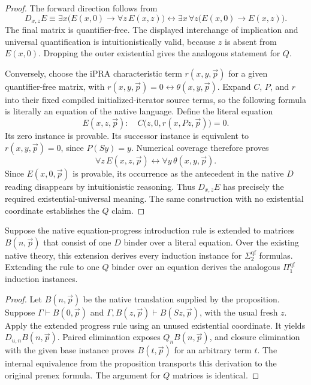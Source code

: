 \begin{proof}
The forward direction follows from
\[
 D_{x,z}E\equiv
 \exists x\bigl(E(x,0)\to\forall z\,E(x,z)\bigr)
 \leftrightarrow
 \exists x\,\forall z\bigl(E(x,0)\to E(x,z)\bigr).
\]
The final matrix is quantifier-free. The displayed interchange of
implication and universal quantification is intuitionistically valid,
because $z$ is absent from $E(x,0)$. Dropping the outer existential gives
the analogous statement for $Q$.

Conversely, choose the iPRA characteristic term $r(x,y,\vec p)$ for a
given quantifier-free matrix, with
$r(x,y,\vec p)=0\leftrightarrow\theta(x,y,\vec p)$. Expand $C$, $P$, and $r$
into their fixed compiled initialized-iterator source terms, so the following
formula is literally an equation of the native language. Define the literal
equation
\[
 E(x,z,\vec p):\quad
 C\bigl(z,0,r(x,Pz,\vec p)\bigr)=0.
\]
Its zero instance is provable. Its successor instance is equivalent to
$r(x,y,\vec p)=0$, since $P(Sy)=y$. Numerical coverage therefore proves
\[
 \forall z\,E(x,z,\vec p)
 \leftrightarrow \forall y\,\theta(x,y,\vec p).
\]
Since $E(x,0,\vec p)$ is provable, its occurrence as the antecedent in
the native $D$ reading disappears by intuitionistic reasoning. Thus
$D_{x,z}E$ has precisely the required existential-universal meaning.
The same construction with no existential coordinate establishes the
$Q$ claim.
\end{proof}

\begin{corollary}
Suppose the native equation-progress introduction rule is extended to
matrices $B(n,\vec p)$ that consist of one $D$ binder over a literal
equation. Over the existing native theory, this extension derives every
induction instance for $\Sigma_2^{\mathrm{qf}}$ formulas. Extending the
rule to one $Q$ binder over an equation derives the analogous
$\Pi_1^{\mathrm{qf}}$ induction instances.
\end{corollary}

\begin{proof}
Let $B(n,\vec p)$ be the native translation supplied by the proposition.
Suppose $\Gamma\vdash B(0,\vec p)$ and
$\Gamma,B(z,\vec p)\vdash B(Sz,\vec p)$, with the usual fresh $z$.
Apply the extended progress rule using an unused existential coordinate.
It yields $D_{u,n}B(n,\vec p)$. Paired elimination exposes
$Q_nB(n,\vec p)$, and closure elimination with the given base instance
proves $B(t,\vec p)$ for an arbitrary term $t$. The internal equivalence
from the proposition transports this derivation to the original prenex
formula. The argument for $Q$ matrices is identical.
\end{proof}

